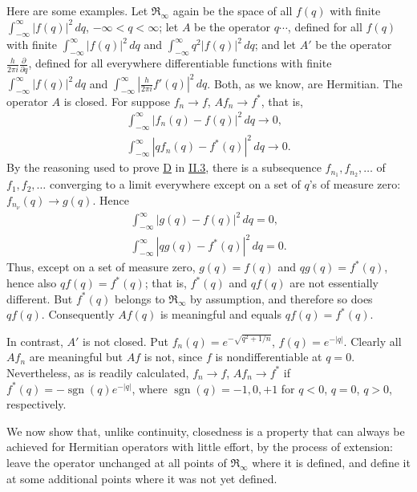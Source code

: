 \documentclass[fontsize=13pt,twoside,openany,headings=normal,parskip=false,bookmarkpackage=false,DIV=calc]{scrbook}
\begin{document}
\hypertarget{origpage-76}{}%
Here are some examples. Let $\mathfrak{R}_\infty$ again be the space of all $f(q)$ with finite $\int_{-\infty}^{\infty}|f(q)|^2\,dq$, $-\infty<q<\infty$; let $A$ be the operator $q\cdots$, defined for all $f(q)$ with finite $\int_{-\infty}^{\infty}|f(q)|^2\,dq$ and $\int_{-\infty}^{\infty}q^2|f(q)|^2\,dq$; and let $A'$ be the operator $\frac{h}{2\pi i}\frac{\partial}{\partial q}$, defined for all everywhere differentiable functions with finite $\int_{-\infty}^{\infty}|f(q)|^2\,dq$ and $\int_{-\infty}^{\infty}|\frac{h}{2\pi i}f'(q)|^2\,dq$. Both, as we know, are Hermitian. The operator $A$ is closed. For suppose $f_n\to f$, $Af_n\to f^*$, that is,
\begin{gather*}
\int_{-\infty}^{\infty}|f_n(q)-f(q)|^2\,dq\to0,\\
\int_{-\infty}^{\infty}|qf_n(q)-f^*(q)|^2\,dq\to0.
\end{gather*}
By the reasoning used to prove \hyperref[ax:II.D]{D} in \hyperref[sec:II.3]{II.3}, there is a subsequence $f_{n_1},f_{n_2},\ldots$ of $f_1,f_2,\ldots$ converging to a limit everywhere except on a set of $q$'s of measure zero: $f_{n_\nu}(q)\to g(q)$. Hence
\begin{gather*}
\int_{-\infty}^{\infty}|g(q)-f(q)|^2\,dq=0,\\
\int_{-\infty}^{\infty}|qg(q)-f^*(q)|^2\,dq=0.
\end{gather*}
Thus, except on a set of measure zero, $g(q)=f(q)$ and $qg(q)=f^*(q)$, hence also $qf(q)=f^*(q)$; that is, $f^*(q)$ and $qf(q)$ are not essentially different. But $f^*(q)$ belongs to $\mathfrak{R}_\infty$ by assumption, and therefore so does $qf(q)$. Consequently $Af(q)$ is meaningful and equals $qf(q)=f^*(q)$.

In contrast, $A'$ is not closed. Put $f_n(q)=e^{-\sqrt{q^2+1/n}}$, $f(q)=e^{-|q|}$. Clearly all $Af_n$ are meaningful but $Af$ is not, since $f$ is nondifferentiable at $q=0$. Nevertheless, as is readily calculated, $f_n\to f$, $Af_n\to f^*$ if $f^*(q)=-\operatorname{sgn}(q)e^{-|q|}$, where $\operatorname{sgn}(q)=-1,0,+1$ for $q<0$, $q=0$, $q>0$, respectively.

We now show that, unlike continuity, closedness is a property that can always be achieved for Hermitian operators with little effort, by the process of extension: leave the operator unchanged at all points of $\mathfrak{R}_\infty$ where it is defined, and define it at some additional points where it was not yet defined.
\end{document}
